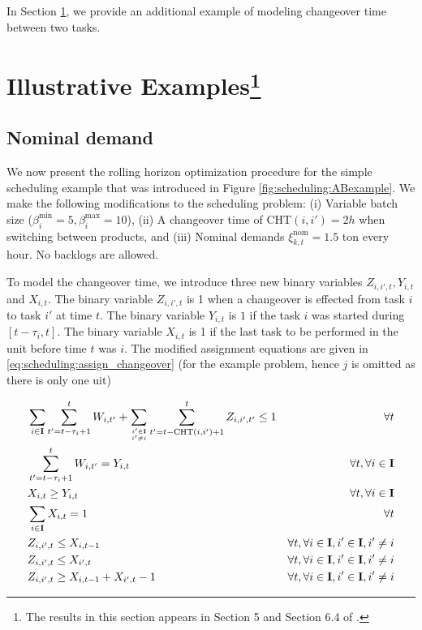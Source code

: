 In Section \ref{sec:scheduling:example}, we provide an additional example
of modeling changeover time between two tasks. 



\section{Illustrative Examples\footnote{The results in this section  appears in Section 5
and Section 6.4 of \citet{subramanian:maravelias:rawlings:2012}.}}
\label{sec:scheduling:example}


\subsection{Nominal demand}
\label{sec:scheduling:example:nominal}
We now present the rolling horizon optimization procedure for the
simple scheduling example that was introduced in Figure
\ref{fig:scheduling:ABexample}. We make the following modifications to
the scheduling problem: (i) Variable batch size ($\beta_i^{\text{min}}
= 5, \beta_i^{\text{max}} = 10$), (ii) A changeover time of
$\text{CHT}(i,i') = 2h$
when switching between products, and (iii) Nominal demands
$\xi_{k,t}^{\text{nom}} = 1.5$ ton every hour. No backlogs are allowed. 

To model the changeover time, we introduce three new binary variables $Z_{i,i',t},Y_{i,t}$ and
$X_{i,t}$. The binary variable $Z_{i,i',t}$ is 1 when a changeover is
effected from task $i$ to task $i'$ at time $t$. The binary variable
$Y_{i,t}$ is $1$ if the task $i$ was started during $[t-\tau_i,t]$. The
binary variable $X_{i,t}$ is 1 if the last task to be performed in the
unit before time $t$ was $i$.  The modified assignment equations are
given in \eqref{eq:scheduling:assign_changeover} (for the example
problem, hence $j$ is omitted as there is only one uit)

\begin{alignat}{2}
&\sum_{i\in \mathbf{I}}\sum_{t' = t-\tau_i+1}^{t}W_{i,t'}+\sum_{i' \in
 \mathbf{I} \atop i' \neq i}\sum_{t'=t-\text{CHT}(i,i')+1}^{t}
Z_{i,i',t'} \leq 1 & \forall t \nonumber \\ 
&\sum_{t' = t-\tau_i+1}^{t} W_{i,t'} = Y_{i,t} & \forall t, \forall i
\in \mathbf{I} \nonumber\\
&X_{i,t} \geq Y_{i,t} & \forall t, \forall i \in \mathbf{I} \nonumber\\
&\sum_{i \in \mathbf{I}}X_{i,t} = 1 & \forall
t  \label{eq:scheduling:assign_changeover}\\ 
&Z_{i,i',t} \leq X_{i,t-1} &\forall t, \forall i \in \mathbf{I}, i' \in
\mathbf{I}, i' \neq i \nonumber\\
&Z_{i,i',t} \leq X_{i',t} &\forall t, \forall i \in \mathbf{I}, i' \in
\mathbf{I}, i'\neq i \nonumber \\
&Z_{i,i',t} \geq X_{i,t-1}+X_{i',t}-1 &\forall t, \forall i \in \mathbf{I}, i' \in
\mathbf{I}, i' \neq i \nonumber
\end{alignat}

